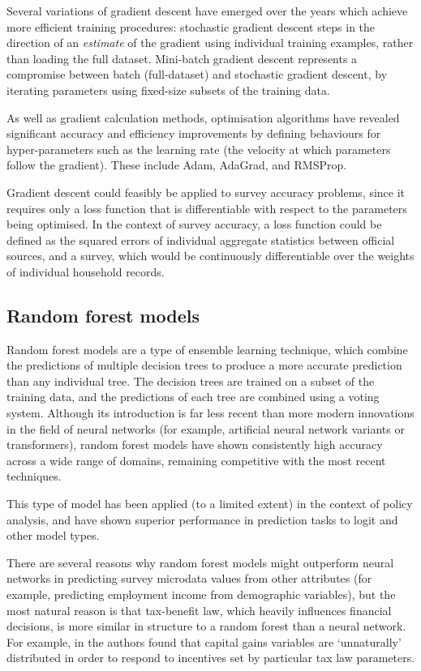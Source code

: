 \documentclass[twocolumn]{article}
\begin{document}
Several variations of gradient descent have emerged over the years which achieve more efficient training procedures: stochastic gradient descent steps in the direction of an \emph{estimate} of the gradient using individual training examples, rather than loading the full dataset.\cite{sgd} Mini-batch gradient descent represents a compromise between batch (full-dataset) and stochastic gradient descent, by iterating parameters using fixed-size subsets of the training data.\cite{mini_batch}

As well as gradient calculation methods, optimisation algorithms have revealed significant accuracy and efficiency improvements by defining behaviours for hyper-parameters such as the learning rate (the velocity at which parameters follow the gradient). These include Adam,\cite{adam} AdaGrad,\cite{adagrad} and RMSProp.

Gradient descent could feasibly be applied to survey accuracy problems, since it requires only a loss function that is differentiable with respect to the parameters being optimised. In the context of survey accuracy, a loss function could be defined as the squared errors of individual aggregate statistics between official sources, and a survey, which would be continuously differentiable over the weights of individual household records.

\subsection{Random forest models}

Random forest models are a type of ensemble learning technique, which combine the predictions of multiple decision trees to produce a more accurate prediction than any individual tree.\cite{random_forests} The decision trees are trained on a subset of the training data, and the predictions of each tree are combined using a voting system. Although its introduction is far less recent than more modern innovations in the field of neural networks (for example, artificial neural network variants\cite{anns} or transformers\cite{transformers}), random forest models have shown consistently high accuracy across a wide range of domains, remaining competitive with the most recent techniques.

This type of model has been applied (to a limited extent) in the context of policy analysis, and have shown superior performance in prediction tasks to logit and other model types.\cite{ecb}

There are several reasons why random forest models might outperform neural networks in predicting survey microdata values from other attributes (for example, predicting employment income from demographic variables), but the most natural reason is that tax-benefit law, which heavily influences financial decisions, is more similar in structure to a random forest than a neural network. For example, in \cite{cg_bunching} the authors found that capital gains variables are `unnaturally' distributed in order to respond to incentives set by particular tax law parameters.
\end{document}
